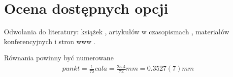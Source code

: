 \documentclass[a4paper,twoside,12pt]{book}
\newcommand{\obcy}[1]{\emph{#1}}
\newcommand{\english}[1]{{\selectlanguage{british}\obcy{#1}}}
\begin{document}
%


\chapter{Ocena dostępnych opcji}

Odwołania do literatury: 
książek \cite{bib:ksiazka},
artykułów w czasopismach \cite{bib:artykul}, 
materiałów konferencyjnych \cite{bib:konferencja}
i stron www \cite{bib:internet}.

Równania powinny być numerowane
\begin{align}
punkt = \frac{1}{72} cala = \frac{25.4}{72} mm = 0.3527(7) mm
\end{align}
%
\end{document}
